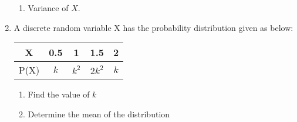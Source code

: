 \begin{enumerate}[label=\thechapter.\arabic*,ref=\thechapter.\theenumi]
\begin{enumerate}[label=\alph*)]
\item Variance of $X$.
\end{enumerate}

\item A discrete random variable X has the probability distribution given as below:
\begin{table}[H]
\begin{tabular}{|c|c|c|c|c|}
\hline
X & 0.5 & 1 & 1.5 & 2 \\
\hline
P(X) & $k$ & $k^{2}$ & $2k^{2}$ & $k$ \\
\hline
\end{tabular}
\end{table}
\begin{enumerate}
\item{Find the value of $k$}
\item{Determine the mean of the distribution}
\end{enumerate}
\solution \\

\end{enumerate}
